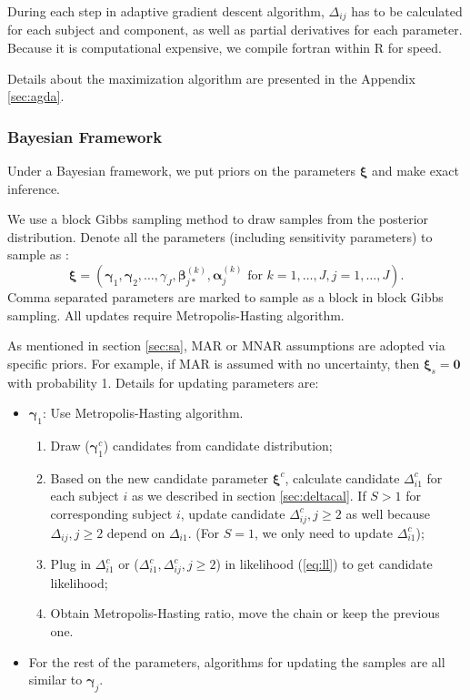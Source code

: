 \documentclass[12pt]{article}
\begin{document}
During each step in adaptive gradient descent algorithm, $\Delta_{ij}$
has to be calculated for each subject and component, as well as
partial derivatives for each parameter. Because it is computational
expensive, we compile fortran within R for speed.

Details about the maximization algorithm are presented in the Appendix
\ref{sec:agda}. 

\subsubsection{Bayesian Framework}
\label{sec:bayesian}

Under a Bayesian framework, we  put priors on the parameters
$\bm \xi$ and make exact inference.

We use a  block Gibbs sampling method to draw samples from the
posterior distribution. Denote all the parameters (including
sensitivity parameters) to sample as :
\begin{displaymath}
  \bm \xi = \left( \bm \gamma_1, \bm \gamma_2, \ldots, \gamma_J, 
    \bm \beta_{j*}^{(k)}, \bm \alpha_j^{(k)}
    \text{ for } k = 1, \ldots, J, j = 1, \ldots, J \right).
\end{displaymath}
Comma separated parameters are marked to sample as a block in block
Gibbs sampling.  All updates require Metropolis-Hasting
algorithm.

As mentioned in section \ref{sec:sa}, MAR or MNAR assumptions are
adopted via specific priors. For example, if MAR is assumed with no
uncertainty, then $ \bm \xi _s= \bm 0$ with probability 1. Details for
updating parameters are:

\begin{itemize}
\item $\bm \gamma_{1} $: Use Metropolis-Hasting algorithm.
  \begin{enumerate}
  \item Draw ($\bm \gamma_{1}^c$) candidates from candidate
    distribution;
  \item Based on the new candidate parameter $\bm \xi^c$, calculate
    candidate $\Delta_{i1}^c$ for each subject $i$ as we described in
    section \ref{sec:deltacal}. If $S > 1$ for corresponding subject
    $i$, update candidate $\Delta_{ij}^c, j \geq 2$ as well because
    $\Delta_{ij}, j \geq 2$ depend on $\Delta_{i1}$. (For $S = 1$, we
    only need to update $\Delta_{i1}^c$);
  \item Plug in $\Delta_{i1}^c$ or ($\Delta_{i1}^c, \Delta_{ij}^c, j
    \geq 2$) in likelihood (\ref{eq:ll}) to get candidate likelihood;
  \item Obtain Metropolis-Hasting ratio, move the chain or keep the
    previous one.
  \end{enumerate}
\item For the rest of the parameters, algorithms for updating the
  samples are all similar to $\bm \gamma_j$.
\end{itemize}
\end{document}
